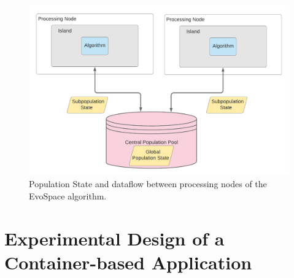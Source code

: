 \documentclass[review]{elsarticle}
\begin{document}
\begin{figure}[ht]
    \centering
    \includegraphics[width=\textwidth]{population_pool}
    \caption{Population State and dataflow between processing nodes of the EvoSpace algorithm.}
    \label{fig:population_pool}
\end{figure}


\section{Experimental Design of a Container-based Application} 
\label{docker}

\end{document}
